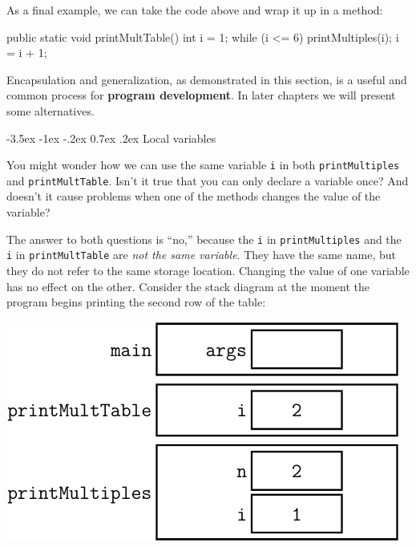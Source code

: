 \documentclass[12pt]{book}
\makeatletter
\theoremstyle{exercise}
\newcommand{\java}[1]{\verb"#1"}
\renewcommand{\section}{\@startsection {section}{1}{\z@}%
    {-3.5ex \@plus -1ex \@minus -.2ex}%
    {0.7ex \@plus.2ex}%
    {\normalfont\Large\bfseries}}
\newcommand{\java}[1]{\lstinline{#1}} %
\makeatother
\begin{document}
As a final example, we can take the code above and wrap it up in a method:

\begin{code}
    public static void printMultTable() {
        int i = 1;
        while (i <= 6) {
            printMultiples(i);
            i = i + 1;
        }
    }
\end{code}


Encapsulation and generalization, as demonstrated in this section, is a useful and common process for {\bf program development}.
In later chapters we will present some alternatives.


\section{Local variables}

You might wonder how we can use the same variable \java{i} in both \java{printMultiples} and \java{printMultTable}.
Isn't it true that you can only declare a variable once?
And doesn't it cause problems when one of the methods changes the value of the variable?

The answer to both questions is ``no,'' because the \java{i} in \java{printMultiples} and the \java{i} in \java{printMultTable} are {\em not the same variable}.
They have the same name, but they do not refer to the same storage location.
Changing the value of one variable has no effect on the other.
Consider the stack diagram at the moment the program begins printing the second row of the table:

\begin{center}
\vspace{1em}
\includegraphics{figs/stack4.pdf}
\vspace{1em}
\end{center}
\end{document}
